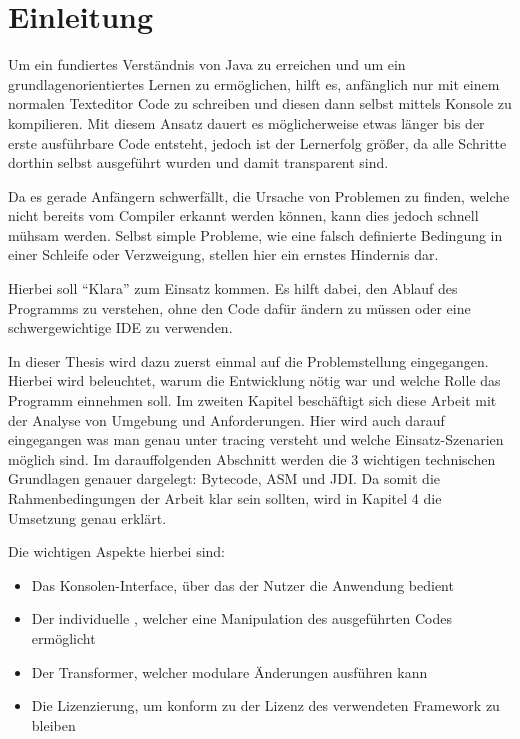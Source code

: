 
\chapter{Einleitung}

Um ein fundiertes Verständnis von Java zu erreichen und um ein grundlagenorientiertes Lernen zu ermöglichen, hilft es, anfänglich nur mit einem normalen Texteditor Code zu schreiben und diesen dann selbst mittels Konsole zu kompilieren.
Mit diesem Ansatz dauert es möglicherweise etwas länger bis der erste ausführbare Code entsteht, jedoch ist der Lernerfolg größer, da alle Schritte dorthin selbst ausgeführt wurden und damit transparent sind.

Da es gerade Anfängern schwerfällt, die Ursache von Problemen zu finden, welche nicht bereits vom Compiler erkannt werden können, kann dies jedoch schnell mühsam werden. Selbst simple Probleme, wie eine falsch definierte Bedingung in einer Schleife oder Verzweigung, stellen hier ein ernstes Hindernis dar.

Hierbei soll "`Klara"' zum Einsatz kommen. Es hilft dabei, den Ablauf des Programms zu verstehen, ohne den Code dafür ändern zu müssen oder eine schwergewichtige \ac{IDE} zu verwenden.

In dieser Thesis wird dazu zuerst einmal auf die Problemstellung eingegangen. Hierbei wird beleuchtet, warum die Entwicklung nötig war und welche Rolle das Programm einnehmen soll.
Im zweiten Kapitel beschäftigt sich diese Arbeit mit der Analyse von Umgebung und Anforderungen. Hier wird auch darauf eingegangen was man genau unter tracing versteht und welche Einsatz-Szenarien möglich sind.
Im darauffolgenden Abschnitt werden die 3 wichtigen technischen Grundlagen genauer dargelegt: Bytecode, ASM und \ac{JDI}.
Da somit die Rahmenbedingungen der Arbeit klar sein sollten, wird in Kapitel 4 die Umsetzung genau erklärt.

Die wichtigen Aspekte hierbei sind:
\begin{itemize}
	\item Das Konsolen-Interface, über das der Nutzer die Anwendung bedient
	\item Der individuelle , welcher eine Manipulation des ausgeführten Codes ermöglicht
	\item Der Transformer, welcher modulare Änderungen ausführen kann
	\item Die Lizenzierung, um konform zu der Lizenz des verwendeten Framework zu bleiben
\end{itemize}

